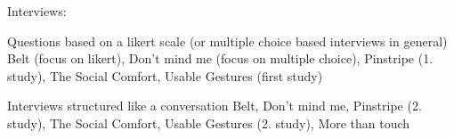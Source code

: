 \documentclass{sigchi}
\begin{document}
Interviews:

Questions based on a likert scale (or multiple choice based interviews in general)
Belt (focus on likert), Don’t mind me (focus on multiple choice), Pinstripe (1. study), The Social Comfort, Usable Gestures (first study)

Interviews structured like a conversation
Belt, Don’t mind me, Pinstripe (2. study), The Social Comfort, Usable Gestures (2. study), More than touch



\end{document}
